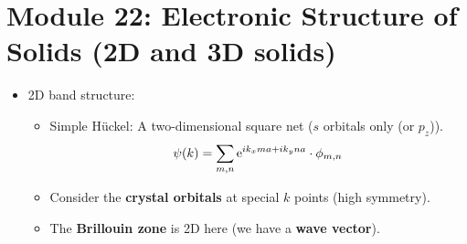 \documentclass[../notes.tex]{subfiles}
\begin{document}
\section{Module 22: Electronic Structure of Solids (2D and 3D solids)}
\begin{itemize}
    \item 2D band structure:
    \begin{itemize}
        \item Simple H\"{u}ckel: A two-dimensional square net ($s$ orbitals only (or $p_z$)).
        \begin{equation*}
            \psi(k) = \sum_{m,n}\e[ik_xma+ik_yna]\cdot\phi_{m,n}
        \end{equation*}
        \item Consider the \textbf{crystal orbitals} at special $k$ points (high symmetry).
        \item The \textbf{Brillouin zone} is 2D here (we have a \textbf{wave vector}).
        \begin{figure}[h!]
            \centering
\end{figure}
\end{itemize}
\end{itemize}
\end{document}
